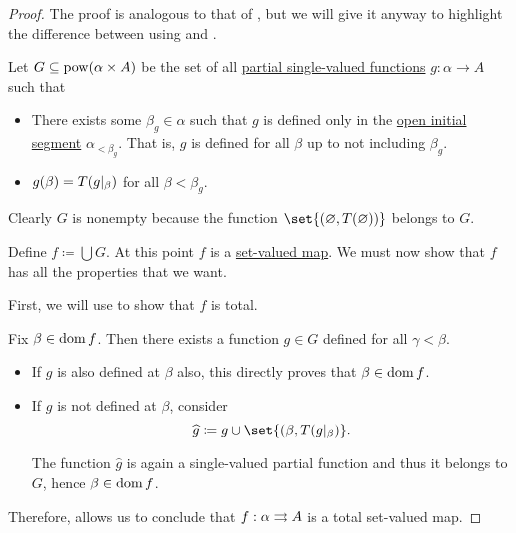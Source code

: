 \begin{proof}
  The proof is analogous to that of , but we will give it anyway to highlight the difference between using  and .

  Let \( G \subseteq \operatorname{pow}(\alpha \times A) \) be the set of all \hyperref[def:set_valued_map/partial]{partial single-valued functions} \( g: \alpha \to A \) such that
  \begin{itemize}
    \item There exists some \( \beta_g \in \alpha \) such that \( g \) is defined only in the \hyperref[def:order_interval/ray]{open initial segment} \( \alpha_{< \beta_g} \). That is, \( g \) is defined for all \( \beta \) up to not including \( \beta_g \).

    \item \( g(\beta) = T(g\vert_\beta) \) for all \( \beta < \beta_g \).
  \end{itemize}

  Clearly \( G \) is nonempty because the function \( \set{ (\varnothing, T(\varnothing)) } \) belongs to \( G \).

  Define \( f \coloneqq \bigcup G \). At this point \( f \) is a \hyperref[def:function]{set-valued map}. We must now show that \( f \) has all the properties that we want.

   First, we will use  to show that \( f \) is total.

  Fix \( \beta \in \operatorname{dom} f \). Then there exists a function \( g \in G \) defined for all \( \gamma < \beta \).

  \begin{itemize}
    \item If \( g \) is also defined at \( \beta \) also, this directly proves that \( \beta \in \operatorname{dom} f \).
    \item If \( g \) is not defined at \( \beta \), consider
    \begin{equation*}
      \widehat g \coloneqq g \cup \set{ (\beta, T(g\restr_\beta) }.
    \end{equation*}

    The function \( \widehat g \) is again a single-valued partial function and thus it belongs to \( G \), hence \( \beta \in \operatorname{dom} f \).
  \end{itemize}

  Therefore,  allows us to conclude that \( f: \alpha \rightrightarrows A \) is a total set-valued map.


\end{proof}
